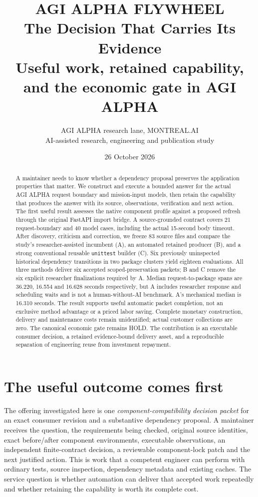 \documentclass[11pt,a4paper]{article}
\title{\color{CosmicPurple}\small\sffamily AGI ALPHA FLYWHEEL\\[0.8em]\normalfont\LARGE\textbf{The Decision That Carries Its Evidence}\\[0.6em]\large Useful work, retained capability, and the economic gate in AGI ALPHA}
\author{AGI ALPHA research lane, MONTREAL.AI\\\small AI-assisted research, engineering and publication study}
\date{26 October 2026}
\newcommand{\Alpha}{AGI ALPHA}
\begin{document}
\maketitle
\begin{abstract}
A maintainer needs to know whether a dependency proposal preserves the application properties that matter. We construct and execute a bounded answer for the actual \Alpha{} request boundary and mission-input models, then retain the capability that produces the answer with its source, observations, verification and next action. The first useful result assesses the native component profile against a proposed refresh through the original FastAPI import bridge. A source-grounded contract covers 21 request-boundary and 40 model cases, including the actual 15-second body timeout. After discovery, criticism and correction, we freeze 83 source files and compare the study's researcher-assisted incumbent (A), an automated retained producer (B), and a strong conventional reusable \texttt{unittest} builder (C). Six previously uninspected historical dependency transitions in two package clusters yield eighteen evaluations. All three methods deliver six accepted scoped-preservation packets; B and C remove the six explicit researcher finalizations required by A. Median request-to-package spans are 36.220, 16.554 and 16.628 seconds respectively, but A includes researcher response and scheduling waits and is not a human-without-AI benchmark. A's mechanical median is 16.310 seconds. The result supports useful automatic packet completion, not an exclusive method advantage or a priced labor saving. Complete monetary construction, delivery and maintenance costs remain unidentified; actual customer collections are zero. The canonical economic gate remains HOLD. The contribution is an executable consumer decision, a retained evidence-bound delivery asset, and a reproducible separation of engineering reuse from investment repayment.
\end{abstract}

\section{The useful outcome comes first}

The offering investigated here is one \emph{component-compatibility decision packet} for an exact consumer revision and a substantive dependency proposal. A maintainer receives the question, the requirements being checked, original source identities, exact before/after component environments, executable observations, an independent finite-contract decision, a reviewable component-lock patch and the next justified action. This is work that a competent engineer can perform with ordinary tests, source inspection, dependency metadata and existing caches. The service question is whether automation can deliver that accepted work repeatedly and whether retaining the capability is worth its complete cost.
\end{document}
